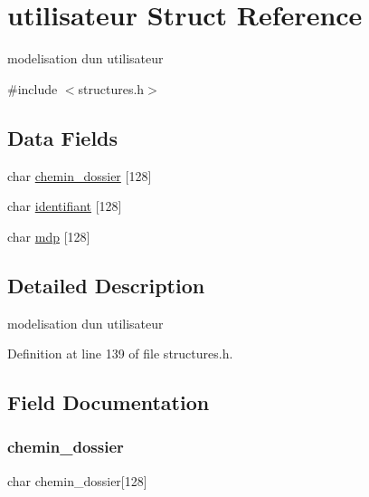 \hypertarget{structutilisateur}{}\section{utilisateur Struct Reference}
\label{structutilisateur}


modelisation d\textquotesingle{}un utilisateur  




{\ttfamily \#include $<$structures.\+h$>$}

\subsection*{Data Fields}
\begin{DoxyCompactItemize}
\item 
char \hyperlink{structutilisateur_a753cd8189e0a1f94f7d7e4d65a343004}{chemin\+\_\+dossier} \mbox{[}128\mbox{]}
\item 
char \hyperlink{structutilisateur_aa9f89c9a3512c982fed4d4789019bdb3}{identifiant} \mbox{[}128\mbox{]}
\item 
char \hyperlink{structutilisateur_a8af71e7f7d7c4089896f8f6498d53a22}{mdp} \mbox{[}128\mbox{]}
\end{DoxyCompactItemize}


\subsection{Detailed Description}
modelisation d\textquotesingle{}un utilisateur 

Definition at line 139 of file structures.\+h.



\subsection{Field Documentation}
\hypertarget{structutilisateur_a753cd8189e0a1f94f7d7e4d65a343004}{}\label{structutilisateur_a753cd8189e0a1f94f7d7e4d65a343004} 
\subsubsection{\texorpdfstring{chemin\+\_\+dossier}{chemin\_dossier}}
{\footnotesize\ttfamily char chemin\+\_\+dossier\mbox{[}128\mbox{]}}



